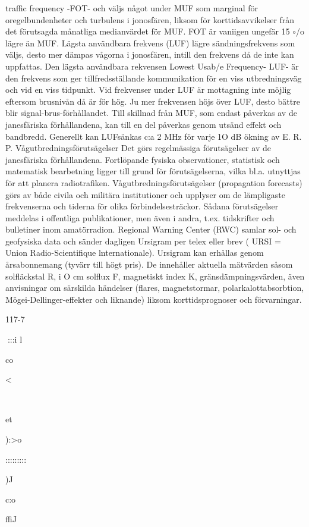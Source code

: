 \documentclass[a4paper,twoside,twocolumn,openright]{book}
\begin{document}
{{{{{{traffic frequency -FOT- och väljs något under MUF som marginal för oregelbundenheter och turbulens i jonosfären, liksom för
korttidsavvikelser från det förutsagda månatliga medianvärdet för MUF. FOT är vaniigen ungefär 15 $\circ$/o lägre än MUF.
Lägsta användbara frekvens (LUF)
lägre sändningsfrekvens som väljs, desto
mer dämpas vågorna i jonosfären, intill den
frekvens då de inte kan uppfattas. Den lägsta användbara rekvensen Lowest Usab/e
Frequency- LUF- är den frekvens som ger
tillfredsställande kommunikation för en viss
utbredningsväg och vid en viss tidpunkt.
Vid frekvenser under LUF är mottagning
inte möjlig eftersom brusnivån då är för hög.
Ju mer frekvensen höjs över LUF, desto
bättre blir signal-brus-förhållandet.
Till skillnad från MUF, som endast påverkas av de janesfäriska förhållandena, kan
till en del påverkas genom utsänd effekt
och bandbredd. Generellt kan LUFsänkas
c:a 2 MHz för varje 1O dB ökning av E. R. P.
Vågutbredningsförutsägelser
Det görs regelmässiga förutsägelser av de
janesfäriska förhållandena. Fortlöpande fysiska observationer, statistisk och matematisk bearbetning ligger till grund för förutsägelserna, vilka bl.a. utnyttjas för att planera
radiotrafiken. Vågutbredningsförutsägelser
(propagation forecasts) görs av både civila
och militära institutioner och upplyser om de
lämpligaste frekvenserna och tiderna för olika förbindelsesträckor. Sådana förutsägelser meddelas i offentliga publikationer, men
även i andra, t.ex. tidskrifter och bulletiner
inom amatörradion.
Regional Warning Center (RWC) samlar
sol- och geofysiska data och sänder dagligen Ursigram per telex eller brev ( URSI =
Union Radio-Scientifique lnternationale).
Ursigram kan erhållas genom årsabonnemang (tyvärr till högt pris). De innehåller
aktuella mätvärden såsom solfläckstal R, i O
cm solflux F, magnetiskt index K, gränsdämpningsvärden, även anvisningar om särskilda händelser (flares,
magnetstormar, polarkalottabsorbtion, Mögei-Dellinger-effekter och liknande) liksom
korttidsprognoser och förvarningar.

117-7

:::i
l

co

<

~

et

):>o

:::::::::

)J

c:o

ffiJ

~

}}}}}}
\end{document}
